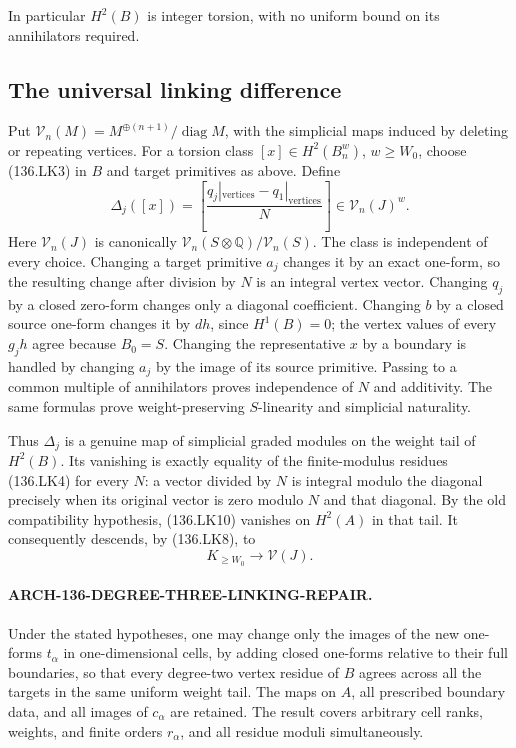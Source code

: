 In particular \(H^2(B)\) is integer torsion, with no
uniform bound on its annihilators required.

\subsection{The universal linking difference}

Put \(\mathcal V_n(M)=M^{\oplus(n+1)}/\operatorname{diag}M\),
with the simplicial maps induced by deleting or repeating
vertices.  For a torsion class \([x]\in H^2(B_n^w)\),
\(w\geq W_0\), choose (136.LK3) in \(B\) and target
primitives as above.  Define
\[
 \Delta_j([x])=
 \left[\frac{q_j|_{\mathrm{vertices}}
                     -q_1|_{\mathrm{vertices}}}{N}\right]
                   \in\mathcal V_n(J)^w.
                                                               \tag{136.LK10}
\]
Here \(\mathcal V_n(J)\) is canonically
\(\mathcal V_n(S\otimes\mathbb Q)/\mathcal V_n(S)\).
The class is independent of every choice.  Changing a target
primitive \(a_j\) changes it by an exact one-form, so the
resulting change after division by \(N\) is an integral
vertex vector.  Changing \(q_j\) by a closed zero-form
changes only a diagonal coefficient.  Changing \(b\) by a
closed source one-form changes it by \(dh\), since
\(H^1(B)=0\); the vertex values of every \(g_jh\)
agree because \(B_0=S\).  Changing the representative
\(x\) by a boundary is handled by changing \(a_j\)
by the image of its source primitive.  Passing to a common
multiple of annihilators proves independence of \(N\)
and additivity.  The same formulas prove weight-preserving
\(S\)-linearity and simplicial naturality.

Thus \(\Delta_j\) is a genuine map of simplicial graded
modules on the weight tail of \(H^2(B)\).  Its vanishing
is exactly equality of the finite-modulus residues (136.LK4)
for every \(N\): a vector divided by \(N\) is integral
modulo the diagonal precisely when its original vector is
zero modulo \(N\) and that diagonal.  By the old compatibility
hypothesis, (136.LK10) vanishes on \(H^2(A)\) in that
tail.  It consequently descends, by (136.LK8), to
\[
                         K_{\geq W_0}\longrightarrow\mathcal V(J).
                                                               \tag{136.LK11}
\]

\paragraph{ARCH-136-DEGREE-THREE-LINKING-REPAIR.}
Under the stated hypotheses, one may change only the images
of the new one-forms \(t_\alpha\) in one-dimensional cells,
by adding closed one-forms relative to their full boundaries,
so that every degree-two vertex residue of \(B\) agrees
across all the targets in the same uniform weight tail.
The maps on \(A\), all prescribed boundary data, and all
images of \(c_\alpha\) are retained.  The result covers
arbitrary cell ranks, weights, and finite orders \(r_\alpha\),
and all residue moduli simultaneously.

